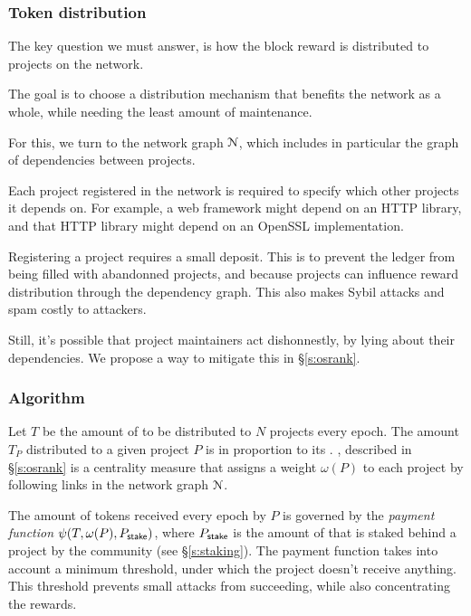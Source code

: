 \subsubsection{Token distribution}

The key question we must answer, is how the block reward is distributed to
projects on the network.

The goal is to choose a distribution mechanism that benefits the network as a
whole, while needing the least amount of maintenance.

For this, we turn to the network graph $\mathcal{N}$, which includes in
particular the graph of dependencies between projects.

Each project registered in the network is required to specify which other
projects it depends on. For example, a web framework might depend on an HTTP
library, and that HTTP library might depend on an OpenSSL implementation.

Registering a project requires a small deposit. This is to prevent the ledger
from being filled with abandonned projects, and because projects can influence
reward distribution through the dependency graph. This also makes Sybil attacks
and spam costly to attackers.

Still, it's possible that project maintainers act dishonnestly, by lying about
their dependencies. We propose a way to mitigate this in \S \ref{s:osrank}.

\subsubsection{Algorithm} Let $T$ be the amount of \oscoin{} to be distributed
to $N$ projects every epoch. The amount $T_P$ distributed to a given project $P$
is in proportion to its \osrank{}. \osrank{}, described in \S \ref{s:osrank} is
a centrality measure that assigns a weight $\omega(P)$ to each project by
following links in the network graph $\mathcal{N}$.

The amount of tokens received every epoch by $P$ is governed by the
\emph{payment function} $\psi(T, \omega(P), P_{\mathsf{stake}})$, where
$P_{\mathsf{stake}}$ is the amount of \oscoin{} that is staked behind a project by
the community (see \S \ref{s:staking}). The payment function takes into account a
minimum threshold, under which the project doesn't receive anything. This
threshold prevents small attacks from succeeding, while also concentrating the
rewards.

